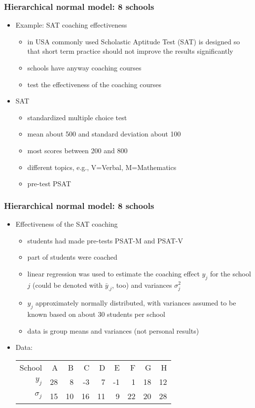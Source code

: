 \documentclass[10pt]{beamer}
\begin{document}
\begin{frame}

\frametitle{Hierarchical normal model: 8 schools}

  \begin{itemize}
  \item Example: SAT coaching effectiveness
    \begin{itemize}
    \item in USA commonly used Scholastic Aptitude Test (SAT) is
      designed so that short term practice should not improve the
      results significantly
    \item schools have anyway coaching courses
    \item test the effectiveness of the coaching courses
    \end{itemize}
    \pause
  \item SAT
    \begin{itemize}
    \item standardized multiple choice test
    \item mean about 500 and standard deviation about 100
    \item most scores between 200 and 800
    \item different topics, e.g., V=Verbal, M=Mathematics
    \item pre-test PSAT
    \end{itemize}
\end{itemize}
\end{frame}

\begin{frame}

\frametitle{Hierarchical normal model: 8 schools}

  \begin{itemize}
  \item Effectiveness of the SAT coaching
    \begin{itemize}
    \item students had made pre-tests PSAT-M and
      PSAT-V
    \item part of students were coached
    \item linear regression was used to estimate the coaching effect
      $y_j$ for the school $j$ (could be denoted with $\bar{y}_{.j}$,
      too) and variances $\sigma_j^2$
    \item $y_j$ approximately normally distributed, with variances
      assumed to be known based on about 30 students per school
    \item data is group means and variances (not personal results)
    \end{itemize}
    \pause
  \item Data:
    {\small
    \begin{tabular}[t]{r | r r r r r r r r}
      School & A & B & C & D & E & F & G & H \\
      $y_j$ & 28 & 8 & -3 & 7 & -1 & 1 & 18 & 12 \\
      $\sigma_j$ & 15 & 10 & 16 & 11 & 9 & 22 & 20 & 28
    \end{tabular}}
  \end{itemize}
\end{frame}
\end{document}
